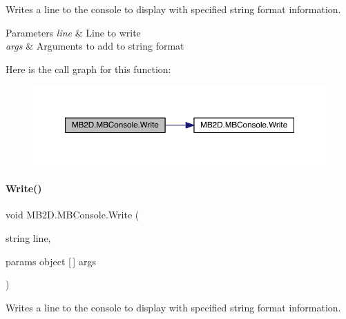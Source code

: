 Writes a line to the console to display with specified string format information. 


\begin{DoxyParams}{Parameters}
{\em line} & Line to write\\
\hline
{\em args} & Arguments to add to string format\\
\hline
\end{DoxyParams}
Here is the call graph for this function\+:
\nopagebreak
\begin{figure}[H]
\begin{center}
\leavevmode
\includegraphics[width=350pt]{class_m_b2_d_1_1_m_b_console_a77bc48284eeebbc13eeced6451513c09_cgraph}
\end{center}
\end{figure}
\hypertarget{class_m_b2_d_1_1_m_b_console_ad7f7617e28472374b97fee653bd786be}{}\label{class_m_b2_d_1_1_m_b_console_ad7f7617e28472374b97fee653bd786be} 
\paragraph{\texorpdfstring{Write()}{Write()}\hspace{0.1cm}{\footnotesize\ttfamily [3/3]}}
{\footnotesize\ttfamily void M\+B2\+D.\+M\+B\+Console.\+Write (\begin{DoxyParamCaption}\item[{string}]{line,  }\item[{params object \mbox{[}$\,$\mbox{]}}]{args }\end{DoxyParamCaption})\hspace{0.3cm}{\ttfamily [inline]}}



Writes a line to the console to display with specified string format information. 


